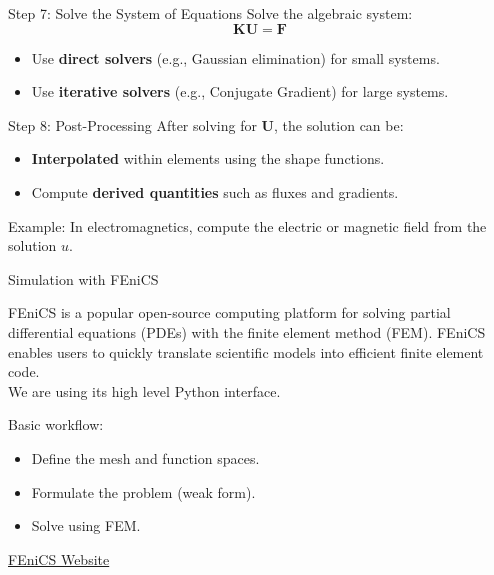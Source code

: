 \documentclass{beamer}
\begin{document}
\begin{frame}{Step 7: Solve the System of Equations}
    Solve the algebraic system:
    \[
    \mathbf{K} \mathbf{U} = \mathbf{F}
    \]
    \begin{itemize}
        \item Use \textbf{direct solvers} (e.g., Gaussian elimination) for small systems.
        \item Use \textbf{iterative solvers} (e.g., Conjugate Gradient) for large systems.
    \end{itemize}
\end{frame}

\begin{frame}{Step 8: Post-Processing}
    After solving for \( \mathbf{U} \), the solution can be:
    \begin{itemize}
        \item \textbf{Interpolated} within elements using the shape functions.
        \item Compute \textbf{derived quantities} such as fluxes and gradients.
    \end{itemize}
    Example: In electromagnetics, compute the electric or magnetic field from the solution \( u \).
\end{frame}


\begin{frame}{Simulation with FEniCS}

FEniCS is a popular open-source computing platform for solving partial differential equations (PDEs) with the finite element method (FEM). FEniCS enables users to quickly translate scientific models into efficient finite element code. \\

We are using its high level Python interface. 

  Basic workflow: 
  \begin{itemize}
    \item Define the mesh and function spaces.
    \item Formulate the problem (weak form).
    \item Solve using FEM.
  \end{itemize}

        \href{https://fenicsproject.org}{FEniCS Website}
\end{frame}
\end{document}

